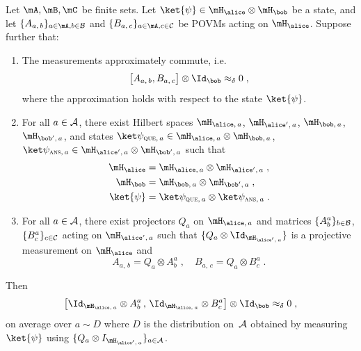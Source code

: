 \begin{lemma}\label{lem:commutation-simplification}
  Let $\mA,\mB,\mC$ be finite sets.
  Let $\ket{\psi} \in \ha \otimes \hb$ be a state, and let $\{A_{a,\, b}\}_{a
    \in \mA, b \in \cal{B}}$ and $\{B_{a,\, c}\}_{a \in \mA, c \in \cal{C}}$ be
  POVMs acting on $\ha$.
  Suppose further that:
  \begin{enumerate}
  \item The measurements approximately commute,
    i.e.\, \label{item:almost-compute}
    \begin{equation*}
      \bigl[ A_{a,\, b}, B_{a,\, c} \bigr] \otimes \Id_\bob \approx_\delta 0\;,
    \end{equation*}
    where the approximation holds with respect to the state $\ket{\psi}$. 
  \item For all $a \in \cal{A}$, there exist Hilbert spaces $\haq$, $\haa$,
    $\hbq$, $\hba$, and states $\sq \in \haq \otimes
    \hbq$, $\sa \in \haa \otimes \hba$ such that
    \begin{align*}
      \ha & = \haq \otimes \haa\;,\\
      \hb & = \hbq \otimes \hba\;,\\
      \ket{\psi} & = \sq \otimes \sa\;.
    \end{align*}
  \item \label{item:weird-decomposition} For all $a \in \cal{A}$, there exist
    projectors $Q_a$ on $\haq$ and matrices $\{A^{a}_b\}_{b \in
      \cal{B}}$, $\{B^{a}_c\}_{c \in \cal{C}}$ acting on $\haa$
    such that $\{Q_a \otimes \Id_{\haa}\}$ is a projective
    measurement on $\ha$ and
    \begin{equation*}
      A_{a, \, b} = Q_a \otimes A^a_b\;, \quad
      B_{a, \, c} = Q_a \otimes B^a_c\;.
    \end{equation*}
  \end{enumerate}
  Then
  \begin{equation*}
    \bigl[ \Id_{\haq} \otimes A^{a}_b \,,\, \Id_{\haq}
    \otimes B^{a}_c \bigr] \otimes \Id_\bob \approx_\delta 0\;,
  \end{equation*}
  on average over $a \sim D$ where $D$ is the distribution on~$\cal{A}$ obtained
  by measuring $\ket{\psi}$ using $\{ Q_a \otimes I_{\haa} \}_{a \in \cal{A}}$.
\end{lemma}
 
